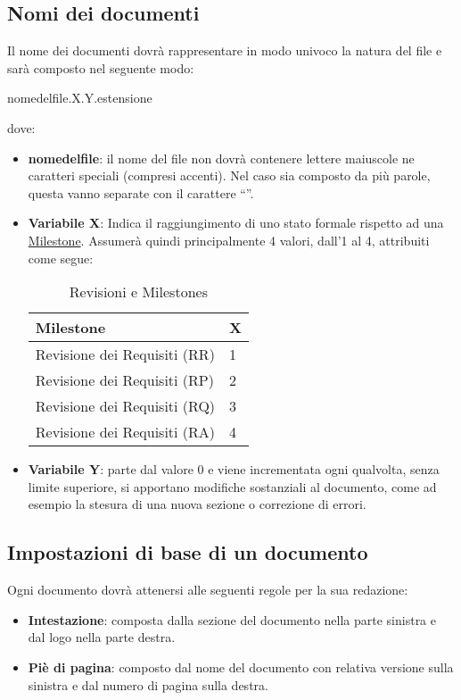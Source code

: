 \subsection{Nomi dei documenti}
\label{sec:nomi_documenti}
Il nome dei documenti dovrà rappresentare in modo univoco la natura del file e sarà composto nel seguente modo:
\begin{center}
nome\textunderscore del\textunderscore file.X.Y.estensione
\end{center}
dove:
\begin{itemize}
\item \textbf{nome\textunderscore del\textunderscore file}: il nome del file non dovrà contenere lettere maiuscole ne caratteri speciali (compresi accenti). Nel caso sia composto da più parole, questa vanno separate con il carattere ``''.
\item \textbf{Variabile X}: Indica il raggiungimento di uno stato formale rispetto ad una \underline{Milestone}. Assumerà quindi principalmente 4 valori, dall'1 al 4, attribuiti come segue:
\begin{table}[h]
\centering
\begin{tabular}{l|l}
\toprule
Milestone & X\\
\midrule
Revisione dei Requisiti (RR) & 1\\
Revisione dei Requisiti (RP) & 2\\
Revisione dei Requisiti (RQ) & 3\\
Revisione dei Requisiti (RA) & 4\\
\bottomrule
\end{tabular}
\caption{Revisioni e Milestones}
\end{table}
\item \textbf{Variabile Y}: parte dal valore 0 e viene incrementata ogni qualvolta, senza limite superiore, si apportano modifiche sostanziali al documento, come ad esempio la stesura di una nuova sezione o correzione di errori.
\end{itemize}

\subsection{Impostazioni di base di un documento}
Ogni documento dovrà attenersi alle seguenti regole per la sua redazione:
\begin{itemize}
\item \textbf{Intestazione}: composta dalla sezione del documento nella parte sinistra e dal logo nella parte destra.
\item \textbf{Piè di pagina}: composto dal nome del documento con relativa versione sulla sinistra  e dal numero di pagina sulla destra.
\end{itemize}

